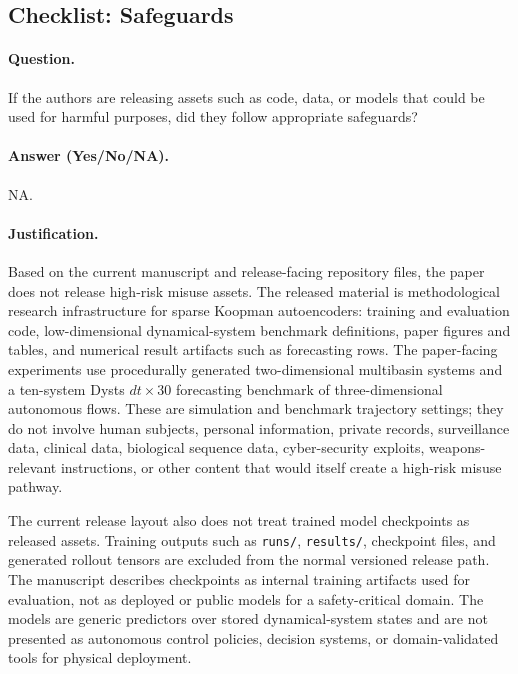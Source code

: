 \subsection{Checklist: Safeguards}
\label{app:checklist_safeguards}

\paragraph{Question.}
If the authors are releasing assets such as code, data, or models that could
be used for harmful purposes, did they follow appropriate safeguards?

\paragraph{Answer (Yes/No/NA).}
NA.

\paragraph{Justification.}
Based on the current manuscript and release-facing repository files, the
paper does not release high-risk misuse assets. The released material is
methodological research infrastructure for sparse Koopman autoencoders:
training and evaluation code, low-dimensional dynamical-system benchmark
definitions, paper figures and tables, and numerical result artifacts such as
forecasting rows. The paper-facing experiments use procedurally generated
two-dimensional multibasin systems and a ten-system Dysts \(dt{\times}30\)
forecasting benchmark of three-dimensional autonomous flows. These are
simulation and benchmark trajectory settings; they do not involve human
subjects, personal information, private records, surveillance data, clinical
data, biological sequence data, cyber-security exploits, weapons-relevant
instructions, or other content that would itself create a high-risk misuse
pathway.

The current release layout also does not treat trained model checkpoints as
released assets. Training outputs such as \texttt{runs/}, \texttt{results/},
checkpoint files, and generated rollout tensors are excluded from the normal
versioned release path. The manuscript describes checkpoints as internal
training artifacts used for evaluation, not as deployed or public models for a
safety-critical domain. The models are generic predictors over stored
dynamical-system states and are not presented as autonomous control policies,
decision systems, or domain-validated tools for physical deployment.

